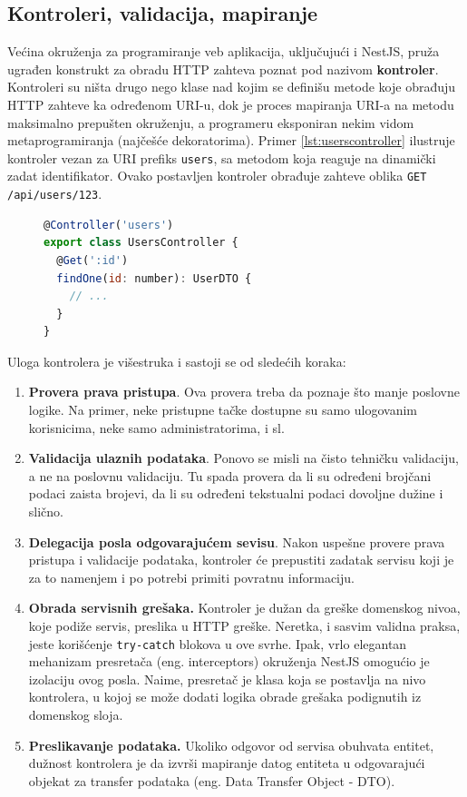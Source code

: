 \documentclass[12pt,oneside]{memoir}
\begin{document}
\subsection{Kontroleri, validacija, mapiranje}

Većina okruženja za programiranje veb aplikacija, uključujući i NestJS, pruža ugrađen konstrukt za obradu HTTP zahteva poznat pod nazivom \textbf{kontroler}. Kontroleri su ništa drugo nego klase nad kojim se definišu metode koje obrađuju HTTP zahteve ka određenom URI-u, dok je proces mapiranja URI-a na metodu maksimalno prepušten okruženju, a programeru eksponiran nekim vidom metaprogramiranja (najčešće dekoratorima). Primer \ref{lst:userscontroller} ilustruje kontroler vezan za URI prefiks \verb|users|, sa metodom koja reaguje na dinamički zadat identifikator. Ovako postavljen kontroler obrađuje zahteve oblika \verb|GET /api/users/123|.

\begin{figure}[h]
\begin{lstlisting}[language=JavaScript, style=ES6, caption={Primer kontrolera.}, label={lst:userscontroller}]
@Controller('users')
export class UsersController {
  @Get(':id')
  findOne(id: number): UserDTO {
    // ...
  }
}
\end{lstlisting}
\end{figure}

Uloga kontrolera je višestruka i sastoji se od sledećih koraka:
\begin{enumerate}
    \item \textbf{Provera prava pristupa}. Ova provera treba da poznaje što manje poslovne logike. Na primer, neke pristupne tačke dostupne su samo ulogovanim korisnicima, neke samo administratorima, i sl.
    \item \textbf{Validacija ulaznih podataka}. Ponovo se misli na čisto tehničku validaciju, a ne na poslovnu validaciju. Tu spada provera da li su određeni brojčani podaci zaista brojevi, da li su određeni tekstualni podaci dovoljne dužine i slično.
    \item \textbf{Delegacija posla odgovarajućem sevisu}. Nakon uspešne provere prava pristupa i validacije podataka, kontroler će prepustiti zadatak servisu koji je za to namenjem i po potrebi primiti povratnu informaciju.
    \item \textbf{Obrada servisnih grešaka.} Kontroler je dužan da greške domenskog nivoa, koje podiže servis, preslika u HTTP greške. Neretka, i sasvim validna praksa, jeste korišćenje \verb|try-catch| blokova u ove svrhe. Ipak, vrlo elegantan mehanizam presretača (eng. interceptors) okruženja NestJS omogućio je izolaciju ovog posla. Naime, presretač je klasa koja se postavlja na nivo kontrolera, u kojoj se može dodati logika obrade grešaka podignutih iz domenskog sloja.
    \item \textbf{Preslikavanje podataka.} Ukoliko odgovor od servisa obuhvata entitet, dužnost kontrolera je da izvrši mapiranje datog entiteta u odgovarajući objekat za transfer podataka (eng. Data Transfer Object - DTO).
\end{enumerate}
\end{document}
